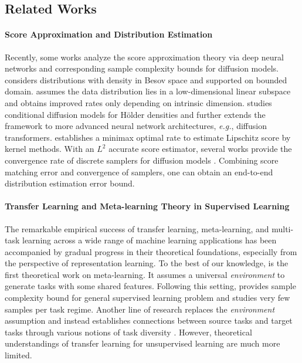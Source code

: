 \documentclass[11pt]{article}
\numberwithin{equation}{section}
\begin{document}
\subsection{Related Works}

\paragraph{Score Approximation and Distribution Estimation}

Recently, some works analyze the score approximation theory via deep neural networks and corresponding sample complexity bounds for diffusion models.
\citet{oko2023diffusion} considers distributions with density in Besov space and supported on bounded domain.
\citet{chen2023score} assumes the data distribution lies in a low-dimensional linear subspace and obtains improved rates only depending on intrinsic dimension.
\citet{fu2024unveil} studies conditional diffusion models for H\"older densities and \citet{hu2024statistical} further extends the framework to more advanced neural network architectures, \textit{e.g.}, diffusion transformers.
\citet{wibisono2024optimal} establishes a minimax optimal rate to estimate Lipschitz score by kernel methods.
With an $L^2$ accurate score estimator, several works provide the convergence rate of discrete samplers for diffusion models \citep{chen2022sampling,chen2023improved,lee2023convergence,chen2024probability}. 
Combining score matching error and convergence of samplers, one can obtain an end-to-end distribution estimation error bound.

\paragraph{Transfer Learning and Meta-learning Theory in Supervised Learning}

The remarkable empirical success of transfer learning, meta-learning, and multi-task learning across a wide range of machine learning applications has been accompanied by gradual progress in their theoretical foundations, especially from
the perspective of representation learning.
To the best of our knowledge, \citet{baxter2000model} is the first theoretical work on meta-learning.
It assumes a universal \textit{environment} to generate tasks with some shared features.
Following this setting, \citet{maurer2016benefit} provides sample complexity bound for general supervised learning problem and \citet{aliakbarpour2024metalearning} studies very few samples per task regime. 
Another line of research replaces the \textit{environment} assumption and instead establishes connections between source tasks and target tasks through various notions of task diversity \citep{tripuraneni2020theory,du2020few,tripuraneni2021provable,watkins2023optimistic,chua2021fine}.
However, theoretical understandings of transfer learning for unsupervised learning are much more limited.
\end{document}

